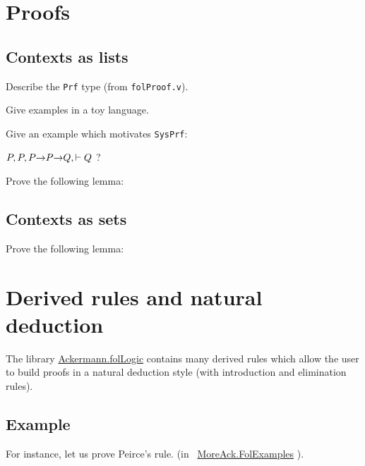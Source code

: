 



\section{Proofs}

\subsection{Contexts as lists}
\begin{todo}
Describe the \texttt{Prf} type (from \texttt{folProof.v}).

Give examples in a toy language.

Give an example which motivates \texttt{SysPrf}:

$P,P , P\mbox{$\rightarrow$} P \mbox{$\rightarrow$} Q, \vdash Q$ ?
\end{todo}

\begin{exercise}

Prove the following lemma:

\end{exercise}

\subsection{Contexts as sets}

\begin{exercise}

Prove the following lemma:

\end{exercise}


\section{Derived rules and natural deduction}


 The library 
 \href{../theories/html/hydras.Ackermann.folLogic.html}{Ackermann.folLogic} contains many derived rules which allow the user to build proofs in a natural deduction style (with introduction and elimination rules).

\subsection{Example}

For instance, let us prove Peirce's rule.
 (in  ~\href{../theories/html/hydras.MoreAck.FolExamples.html}{MoreAck.FolExamples} ).

